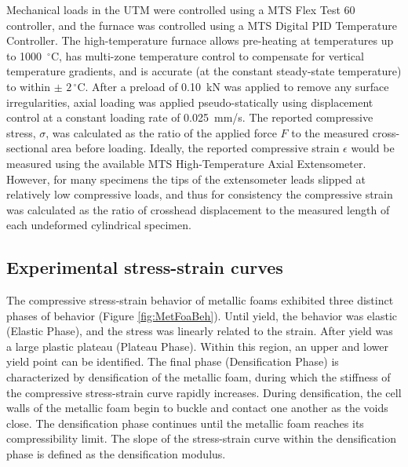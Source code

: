 \documentclass[review]{elsarticle}
\begin{document}
Mechanical loads in the UTM were controlled using a MTS Flex Test 60 controller, and the furnace was controlled using a MTS Digital PID Temperature Controller. The high-temperature furnace allows pre-heating at temperatures up to 1000~$^{\circ}\mathrm{C}$, has multi-zone temperature control to compensate for vertical temperature gradients, and is accurate (at the constant steady-state temperature) to within $\pm$ $2\,^{\circ}\mathrm{C}$. After a preload of 0.10~kN was applied to remove any surface irregularities, axial loading was applied pseudo-statically using displacement control at a constant loading rate of 0.025~mm/s. The reported compressive stress, $\sigma$, was calculated as the ratio of the applied force $F$ to the measured cross-sectional area before loading. Ideally, the reported compressive strain $\epsilon$ would be measured using the available MTS High-Temperature Axial Extensometer. However, for many specimens the tips of the extensometer leads slipped at relatively low compressive loads, and thus for consistency the compressive strain was calculated as the ratio of crosshead displacement to the measured length of each undeformed cylindrical specimen.

\subsection{Experimental stress-strain curves}

The compressive stress-strain behavior of metallic foams exhibited three distinct phases of behavior (Figure \ref{fig:MetFoaBeh}). Until yield, the behavior was elastic (Elastic Phase), and the stress was linearly related to the strain. After yield was a large plastic plateau (Plateau Phase). Within this region, an upper and lower yield point can be identified. The final phase (Densification Phase) is characterized by densification of the metallic foam, during which the stiffness of the compressive stress-strain curve rapidly increases. During densification, the cell walls of the metallic foam begin to buckle and contact one another as the voids close. The densification phase continues until the metallic foam reaches its compressibility limit. The slope of the stress-strain curve within the densification phase is defined as the densification modulus.
\end{document}
